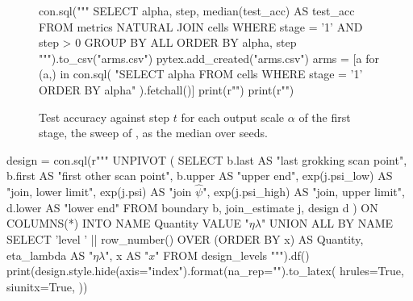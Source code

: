 \documentclass[a4paper,11pt]{article} %
\begin{document}
\begin{figure}[t]
  \centering
\begin{pycode}
con.sql("""
    SELECT alpha, step, median(test_acc) AS test_acc
    FROM metrics NATURAL JOIN cells
    WHERE stage = '1' AND step > 0
    GROUP BY ALL
    ORDER BY alpha, step
""").to_csv("arms.csv")
pytex.add_created("arms.csv")
arms = [a for (a,) in con.sql(
    "SELECT alpha FROM cells WHERE stage = '1' ORDER BY alpha"
).fetchall()]
print(r"\def\armvalues{" + ",".join(map(str, arms)) + "}")
print(r"")
\end{pycode}
  \caption{Test accuracy against step $t$ for each output scale $\alpha$ of
    the first stage, the sweep of
    \citet[Fig.~2c]{kumarGrokkingTransitionLazy2024},
  as the median over  seeds.}
  \label{fig:arms}
\end{figure}

\begin{table}[t]
  \centering
  \caption{The sequential design
    \citep[Sec.~5.4]{bergerIntroductionOptimalDesigns2009}. The scan's last
    grokking point, its first other point and their geometric midpoint, the
    upper end of the range
    \citep[App.~G.2.1]{pracherSpectralTheoryGrokking2026};
    the join $\hat\psi$ of the broken line fitted to the scan runs, with its
    interval \citep{muggeoSegmentedPackageFit2008}; the lower end of the scan;
    and the four levels of \citet[Sec.~4.1]{parkExperimentalDesignsFitting1978a}
  at $x$, $\ln\eta\lambda$ rescaled to $[-1,1]$.}
  \label{tab:design}
\begin{pycode}
design = con.sql(r"""
    UNPIVOT (
        SELECT b.last AS "last grokking scan point",
            b.first AS "first other scan point",
            b.upper AS "upper end",
            exp(j.psi_low) AS "join, lower limit",
            exp(j.psi) AS "join $\hat\psi$",
            exp(j.psi_high) AS "join, upper limit",
            d.lower AS "lower end"
        FROM boundary b, join_estimate j, design d
    ) ON COLUMNS(*) INTO NAME Quantity VALUE "$\eta\lambda$"
    UNION ALL BY NAME
    SELECT 'level ' || row_number() OVER (ORDER BY x) AS Quantity,
        eta_lambda AS "$\eta\lambda$", x AS "$x$"
    FROM design_levels
""").df()
print(design.style.hide(axis="index").format(na_rep="").to_latex(
    hrules=True, siunitx=True,
))
\end{pycode}
\end{table}
\end{document}
